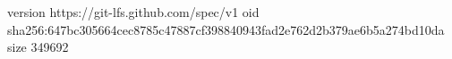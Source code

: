 version https://git-lfs.github.com/spec/v1
oid sha256:647bc305664cec8785c47887cf398840943fad2e762d2b379ae6b5a274bd10da
size 349692
